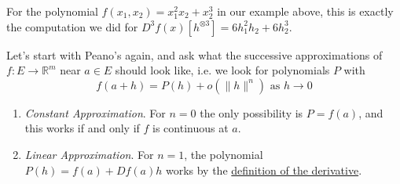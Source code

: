  For the polynomial $f(x_1, x_2) = x_1^2 x_2 + x_2^3$ in our example above, this is exactly the computation we did for $D^3 f(x) [h^{\otimes 3}] = 6 h_1^2 h_2 + 6 h_2^3$. 


  Let's start with Peano's again, and ask what the successive approximations of $f: E \to \mathbb{R}^m$ near $a \in E$ should look like, i.e. we look for polynomials $P$ with
  \begin{equation}
    f(a + h) = P(h) + o(\|h\|^n) \text{ as } h \to 0
  \end{equation}
  \begin{enumerate}
    \item \textit{Constant Approximation}. For $n = 0$ the only possibility is $P = f(a)$, and this works if and only if $f$ is continuous at $a$. 

    \item \textit{Linear Approximation}. For $n = 1$, the polynomial $P(h) = f(a) + Df(a) h$ works by the \hyperref[def:derivative]{definition of the derivative}. 


\end{enumerate}
